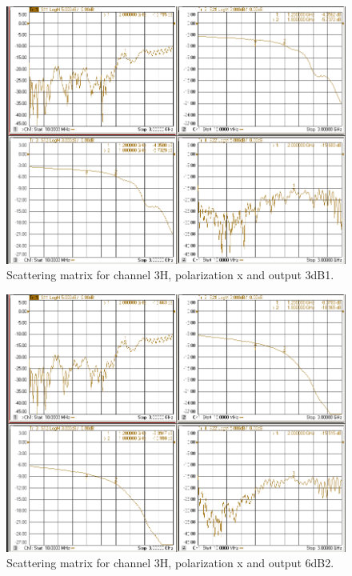 \documentclass[12pt,a4paper,oneside]{article}
\begin{document}
\begin{figure}[H]
\centering
\includegraphics[width=0.9\linewidth]{VNA_results/3Hx_3dB1.png}
\caption{Scattering matrix for channel 3H, polarization x and output 3dB1.}
\label{fig:3Hx_3dB1}
\end{figure}


\begin{figure}[H]
\centering
\includegraphics[width=0.9\linewidth]{VNA_results/3Hx_6dB2.png}
\caption{Scattering matrix for channel 3H, polarization x and output 6dB2.}
\label{fig:3Hx_6dB2}
\end{figure}
\end{document}
